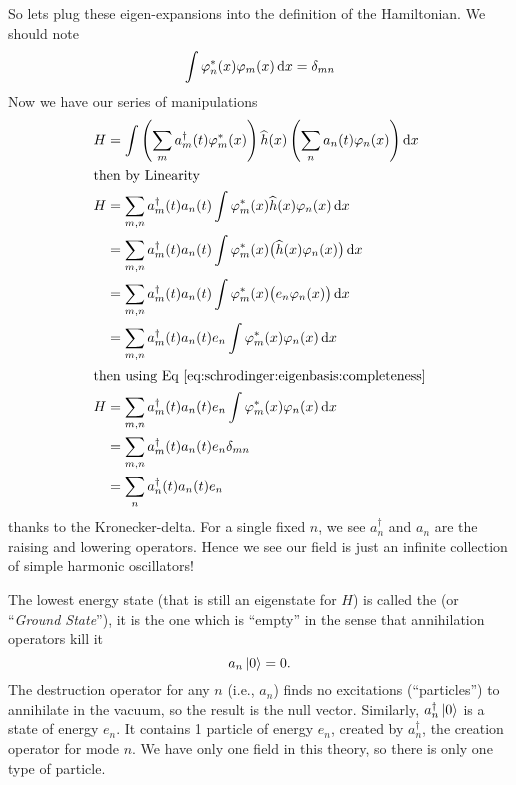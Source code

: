 So lets plug these eigen-expansions into the definition of the
Hamiltonian. We should note
\begin{equation}\label{eq:schrodinger:eigenbasis:completeness}
\int\varphi^{*}_{n}(x)\varphi_{m}(x)\,\mathrm{d} x=\delta_{mn}
\end{equation}
Now we have our series of manipulations
\begin{subequations}
\begin{align}
H
&=\int\left(\sum_{m}a^{\dagger}_{m}(t)\varphi^{*}_{m}(x)\right)
      \widehat{h}(x)
      \left(\sum_{n}a_{n}(t)\varphi_{n}(x)\right)\mathrm{d} x\\
\intertext{then by Linearity}
H
&=\sum_{m,n}a^{\dagger}_{m}(t)a_{n}(t)\int\varphi^{*}_{m}(x)\widehat{h}(x)\varphi_{n}(x)\,\mathrm{d}{x}\\
&=\sum_{m,n}a^{\dagger}_{m}(t)a_{n}(t)\int\varphi^{*}_{m}(x)\bigl(\widehat{h}(x)\varphi_{n}(x)\bigr)\,\mathrm{d}{x}\\
&=\sum_{m,n}a^{\dagger}_{m}(t)a_{n}(t)\int\varphi^{*}_{m}(x)\bigl(e_{n}\varphi_{n}(x)\bigr)\,\mathrm{d}{x}\\
&=\sum_{m,n}a^{\dagger}_{m}(t)a_{n}(t)e_{n}\int\varphi^{*}_{m}(x)\varphi_{n}(x)\,\mathrm{d}{x}\\
\intertext{then using Eq \eqref{eq:schrodinger:eigenbasis:completeness}}
H
&=\sum_{m,n}a^{\dagger}_{m}(t)a_{n}(t)e_{n}\int\varphi^{*}_{m}(x)\varphi_{n}(x)\,\mathrm{d}{x}\nonumber\\
&=\sum_{m,n}a^{\dagger}_{m}(t)a_{n}(t)e_{n}\delta_{mn}\\
&=\sum_{n}a^{\dagger}_{n}(t)a_{n}(t)e_{n}
\end{align}
\end{subequations}
thanks to the Kronecker-delta. For a single fixed $n$, we
see
$a^{\dagger}_{n}$ and $a_{n}$ are the raising and lowering
operators. Hence we see our field is just an infinite collection of
simple harmonic oscillators!

The lowest energy state (that is still an eigenstate for $H$) is called
the  (or ``\emph{Ground State}''), it is the one
which is ``empty'' in the sense that annihilation operators kill it
\begin{equation}\label{eq:schrodinger:def-of-vacuum}
a_{n}\ket{0} = 0.
\end{equation}
The destruction operator for any $n$ (i.e., $a_{n}$) finds no
excitations (``particles'') to annihilate in the vacuum, so the result
is the null vector. Similarly, $a^{\dagger}_{n}\ket{0}$ is a state of
energy $e_{n}$. It contains 1 particle of energy $e_{n}$, created by
$a^{\dagger}_{n}$, the creation operator for mode $n$. We have only one
field in this theory, so there is only one type of particle.

